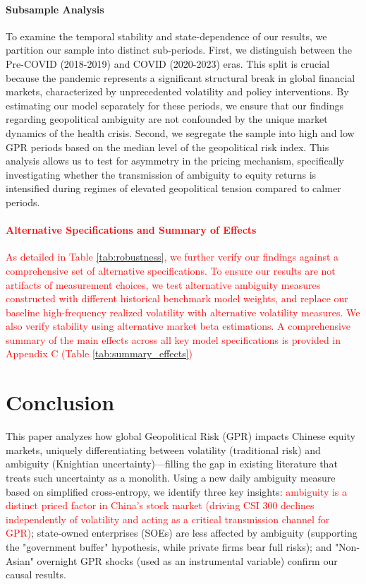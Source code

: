 \documentclass[preprint,12pt,authoryear]{elsarticle}
\begin{document}
\paragraph{Subsample Analysis} To examine the temporal stability and state-dependence of our results, we partition our sample into distinct sub-periods. First, we distinguish between the Pre-COVID (2018-2019) and COVID (2020-2023) eras. This split is crucial because the pandemic represents a significant structural break in global financial markets, characterized by unprecedented volatility and policy interventions. By estimating our model separately for these periods, we ensure that our findings regarding geopolitical ambiguity are not confounded by the unique market dynamics of the health crisis. Second, we segregate the sample into high and low GPR periods based on the median level of the geopolitical risk index. This analysis allows us to test for asymmetry in the pricing mechanism, specifically investigating whether the transmission of ambiguity to equity returns is intensified during regimes of elevated geopolitical tension compared to calmer periods.

\textcolor{red}{\paragraph{Alternative Specifications and Summary of Effects} As detailed in Table \ref{tab:robustness}, we further verify our findings against a comprehensive set of alternative specifications. To ensure our results are not artifacts of measurement choices, we test alternative ambiguity measures constructed with different historical benchmark model weights, and replace our baseline high-frequency realized volatility with alternative volatility measures. We also verify stability using alternative market beta estimations. A comprehensive summary of the main effects across all key model specifications is provided in Appendix C (Table \ref{tab:summary_effects})}

\section{Conclusion}
\label{sec:conclusion}

This paper analyzes how global Geopolitical Risk (GPR) impacts Chinese equity markets, uniquely differentiating between volatility (traditional risk) and ambiguity (Knightian uncertainty)—filling the gap in existing literature that treats such uncertainty as a monolith. Using a new daily ambiguity measure based on simplified cross-entropy, we identify three key insights: \textcolor{red}{ambiguity is a distinct priced factor in China's stock market (driving CSI 300 declines independently of volatility and acting as a critical transmission channel for GPR)}; state-owned enterprises (SOEs) are less affected by ambiguity (supporting the "government buffer" hypothesis, while private firms bear full risks); and "Non-Asian" overnight GPR shocks (used as an instrumental variable) confirm our causal results.
\end{document}
